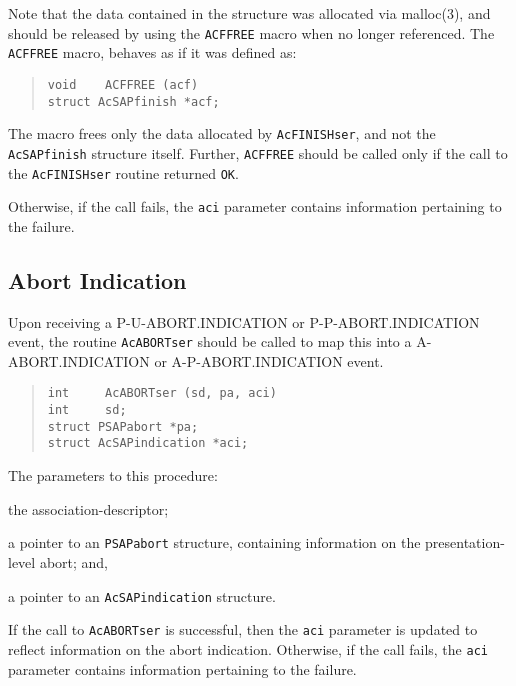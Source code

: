 Note that the data contained in the structure was allocated via \man malloc(3),
and should be released by using the \verb"ACFFREE" macro when no longer
referenced.
The \verb"ACFFREE" macro,
behaves as if it was defined as:\label{ACFFREE}
\begin{quote}\small\begin{verbatim}
void    ACFFREE (acf)
struct AcSAPfinish *acf;
\end{verbatim}\end{quote}
The macro frees only the data allocated by \verb"AcFINISHser",
and not the \verb"AcSAPfinish" structure itself.
Further,
\verb"ACFFREE" should be called only if the call to the \verb"AcFINISHser"
routine returned \verb"OK".

Otherwise,
if the call fails,
the \verb"aci" parameter contains information pertaining to the failure.

\subsection	{Abort Indication}
Upon receiving a {\sf P-U-ABORT.INDICATION\/} or {\sf P-P-ABORT.INDICATION\/}
event,
the routine \verb"AcABORTser" should be called to map this into a
{\sf A-ABORT.INDICATION\/} or {\sf A-P-ABORT.INDICATION\/} event.
\begin{quote}\small\begin{verbatim}
int     AcABORTser (sd, pa, aci)
int     sd;
struct PSAPabort *pa;
struct AcSAPindication *aci;
\end{verbatim}\end{quote}
The parameters to this procedure:
\begin{describe}
\item[\verb"sd":] the association-descriptor;

\item[\verb"pa":] a pointer to an \verb"PSAPabort" structure,
containing information on the presentation-level abort;
and,

\item[\verb"aci":] a pointer to an \verb"AcSAPindication" structure.
\end{describe}
If the call to \verb"AcABORTser" is successful,
then the \verb"aci" parameter is updated to reflect information on the abort
indication.
Otherwise,
if the call fails,
the \verb"aci" parameter contains information pertaining to the failure.

